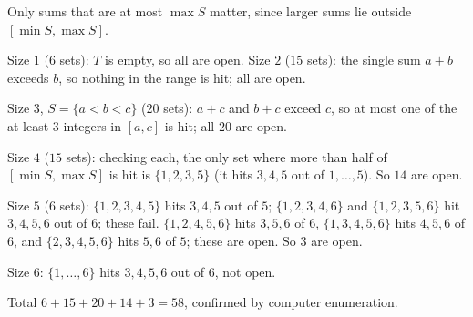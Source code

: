 Only sums that are at most $\max S$ matter, since larger sums lie outside $[\min S,\max S]$.

Size $1$ ($6$ sets): $T$ is empty, so all are open. Size $2$ ($15$ sets): the single sum $a+b$ exceeds $b$, so nothing in the range is hit; all are open.

Size $3$, $S=\{a<b<c\}$ ($20$ sets): $a+c$ and $b+c$ exceed $c$, so at most one of the at least $3$ integers in $[a,c]$ is hit; all $20$ are open.

Size $4$ ($15$ sets): checking each, the only set where more than half of $[\min S,\max S]$ is hit is $\{1,2,3,5\}$ (it hits $3,4,5$ out of $1,\dots,5$). So $14$ are open.

Size $5$ ($6$ sets): $\{1,2,3,4,5\}$ hits $3,4,5$ out of $5$; $\{1,2,3,4,6\}$ and $\{1,2,3,5,6\}$ hit $3,4,5,6$ out of $6$; these fail. $\{1,2,4,5,6\}$ hits $3,5,6$ of $6$, $\{1,3,4,5,6\}$ hits $4,5,6$ of $6$, and $\{2,3,4,5,6\}$ hits $5,6$ of $5$; these are open. So $3$ are open.

Size $6$: $\{1,\dots,6\}$ hits $3,4,5,6$ out of $6$, not open.

Total $6+15+20+14+3=\boxed{58}$, confirmed by computer enumeration.
